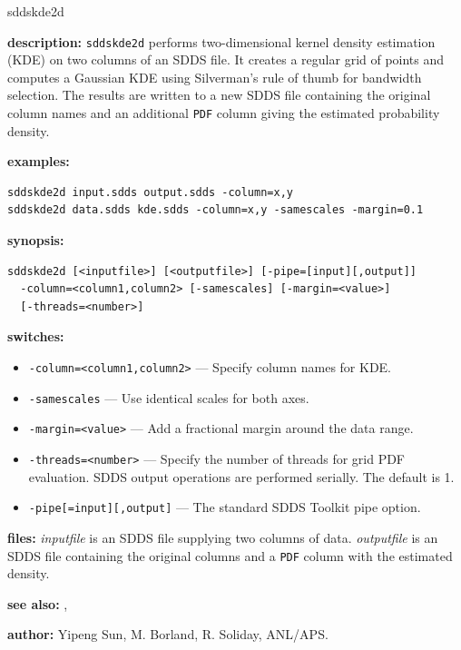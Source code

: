 \begin{sddsprog}{sddskde2d}
  \item \textbf{description:} \verb|sddskde2d| performs two-dimensional kernel density estimation (KDE) on two columns of an SDDS file. It creates a regular grid of points and computes a Gaussian KDE using Silverman's rule of thumb for bandwidth selection. The results are written to a new SDDS file containing the original column names and an additional \verb|PDF| column giving the estimated probability density.

  \item \textbf{examples:}
    \begin{verbatim}
sddskde2d input.sdds output.sdds -column=x,y
sddskde2d data.sdds kde.sdds -column=x,y -samescales -margin=0.1
    \end{verbatim}

  \item \textbf{synopsis:}
    \begin{verbatim}
sddskde2d [<inputfile>] [<outputfile>] [-pipe=[input][,output]]
  -column=<column1,column2> [-samescales] [-margin=<value>]
  [-threads=<number>]
    \end{verbatim}

  \item \textbf{switches:}
    \begin{itemize}
      \item \verb|-column=<column1,column2>| --- Specify column names for KDE.
      \item \verb|-samescales| --- Use identical scales for both axes.
      \item \verb|-margin=<value>| --- Add a fractional margin around the data range.
      \item \verb|-threads=<number>| --- Specify the number of threads for grid PDF evaluation. SDDS output operations are performed serially. The default is 1.
      \item \verb|-pipe[=input][,output]| --- The standard SDDS Toolkit pipe option.
    \end{itemize}

  \item \textbf{files:} \emph{inputfile} is an SDDS file supplying two columns of data. \emph{outputfile} is an SDDS file containing the original columns and a \verb|PDF| column with the estimated density.

  \item \textbf{see also:} , 

  \item \textbf{author:} Yipeng Sun, M. Borland, R. Soliday, ANL/APS.
\end{sddsprog}
